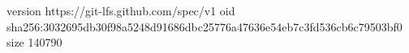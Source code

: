 version https://git-lfs.github.com/spec/v1
oid sha256:3032695db30f98a5248d91686dbc25776a47636e54eb7c3fd536cb6c79503bf0
size 140790
